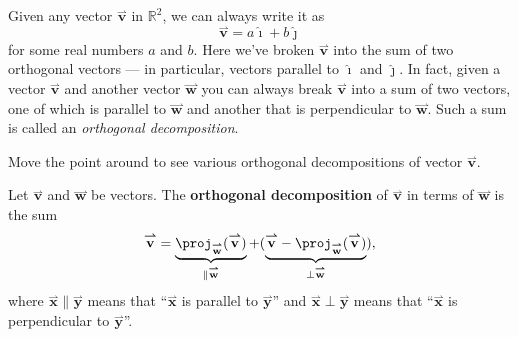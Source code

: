 \documentclass{ximera}
\begin{document}
Given any vector $\overset{\boldsymbol{\rightharpoonup}}{\mathbf{v}}$ in $\mathbb{R}^2$, we can always write it as
\[
\overset{\boldsymbol{\rightharpoonup}}{\mathbf{v}} = a\boldsymbol{\hat{\imath}} + b\boldsymbol{\hat{\jmath}}
\]
for some real numbers $a$ and $b$.  Here we've broken $\overset{\boldsymbol{\rightharpoonup}}{\mathbf{v}}$ into
the sum of two orthogonal vectors --- in particular, vectors parallel to
$\boldsymbol{\hat{\imath}}$ and $\boldsymbol{\hat{\jmath}}$. In fact, given a vector $\overset{\boldsymbol{\rightharpoonup}}{\mathbf{v}}$ and another
vector $\overset{\boldsymbol{\rightharpoonup}}{\mathbf{w}}$ you can always break $\overset{\boldsymbol{\rightharpoonup}}{\mathbf{v}}$ into a sum of two
vectors, one of which is parallel to $\overset{\boldsymbol{\rightharpoonup}}{\mathbf{w}}$ and another that is
perpendicular to $\overset{\boldsymbol{\rightharpoonup}}{\mathbf{w}}$. Such a sum is called an \textit{orthogonal
  decomposition}.
\begin{onlineOnly}
  Move the point around to see various orthogonal decompositions of
  vector $\overset{\boldsymbol{\rightharpoonup}}{\mathbf{v}}$.
  \begin{center}
  \end{center}
\end{onlineOnly}

\begin{definition}
Let $\overset{\boldsymbol{\rightharpoonup}}{\mathbf{v}}$ and $\overset{\boldsymbol{\rightharpoonup}}{\mathbf{w}}$ be vectors. The \textbf{orthogonal
  decomposition} of $\overset{\boldsymbol{\rightharpoonup}}{\mathbf{v}}$ in terms of $\overset{\boldsymbol{\rightharpoonup}}{\mathbf{w}}$ is the sum
\[
\overset{\boldsymbol{\rightharpoonup}}{\mathbf{v}} = \underbrace{\proj_{\overset{\boldsymbol{\rightharpoonup}}{\mathbf{w}}}(\overset{\boldsymbol{\rightharpoonup}}{\mathbf{v}})}_{\parallel \overset{\boldsymbol{\rightharpoonup}}{\mathbf{w}}} +  (\underbrace{\overset{\boldsymbol{\rightharpoonup}}{\mathbf{v}}-\proj_{\overset{\boldsymbol{\rightharpoonup}}{\mathbf{w}}}(\overset{\boldsymbol{\rightharpoonup}}{\mathbf{v}})}_{\perp \overset{\boldsymbol{\rightharpoonup}}{\mathbf{w}}}),
\]
where $\overset{\boldsymbol{\rightharpoonup}}{\mathbf{x}} \parallel \overset{\boldsymbol{\rightharpoonup}}{\mathbf{y}}$ means that ``$\overset{\boldsymbol{\rightharpoonup}}{\mathbf{x}}$ is parallel
to $\overset{\boldsymbol{\rightharpoonup}}{\mathbf{y}}$'' and $\overset{\boldsymbol{\rightharpoonup}}{\mathbf{x}} \perp\overset{\boldsymbol{\rightharpoonup}}{\mathbf{y}}$ means that ``$\overset{\boldsymbol{\rightharpoonup}}{\mathbf{x}}$ is
perpendicular to $\overset{\boldsymbol{\rightharpoonup}}{\mathbf{y}}$''.
\end{definition}
\end{document}
